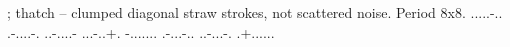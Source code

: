 ; thatch -- clumped diagonal straw strokes, not scattered noise. Period 8x8.
.....-..
.-....-.
..-....-
...-..+.
-.......
.-...-..
..-...-.
.+......
